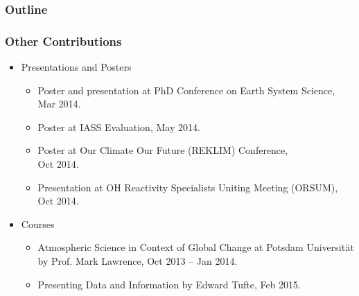 \begin{frame}
    \frametitle{Outline} 
    \tableofcontents[currentsection]
\end{frame} 

\begin{frame}
    \frametitle{Other Contributions}

    \vspace{-5mm}
    \begin{itemize}
        \item Presentations and Posters
            \begin{itemize}
                \item Poster and presentation at PhD Conference on Earth System Science, Mar 2014.
                \item Poster at IASS Evaluation, May 2014.
                \item Poster at Our Climate Our Future (REKLIM) Conference,\\ Oct 2014.
                \item Presentation at OH Reactivity Specialists Uniting Meeting (ORSUM), Oct 2014.
            \end{itemize}
        \item Courses
            \begin{itemize}
                \item Atmospheric Science in Context of Global Change at Potsdam Universit\"{a}t by Prof. Mark Lawrence, Oct 2013 -- Jan 2014.
                \item Presenting Data and Information by Edward Tufte, Feb 2015.
            \end{itemize}
    \end{itemize}
\end{frame}
